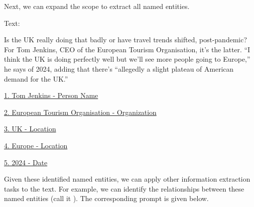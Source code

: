 Next, we can expand the scope to extract all named entities.

\vspace{0.5em}
\begin{tcolorbox}

\begingroup
\setlength{\leftskip}{2em}
\setlength{\rightskip}{2em}


\vspace{0.7em}

Text:

Is the UK really doing that badly or have travel trends shifted, post-pandemic? For Tom Jenkins, CEO of the European Tourism Organisation, it's the latter. ``I think the UK is doing perfectly well but we'll see more people going to Europe,'' he says of 2024, adding that there's ``allegedly a slight plateau of American demand for the UK.''

\vspace{0.7em}

\underline{1. Tom Jenkins - Person Name}

\vspace{0.3em}

\underline{2. European Tourism Organisation - Organization}

\vspace{0.3em}

\underline{3. UK - Location}

\vspace{0.3em}

\underline{4. Europe - Location}

\vspace{0.3em}

\underline{5. 2024 - Date}

\endgroup

\end{tcolorbox}
\vspace{0.5em}

Given these identified named entities, we can apply other information extraction tasks to the text. For example, we can identify the relationships between these named entities (call it ). The corresponding prompt is given below.

